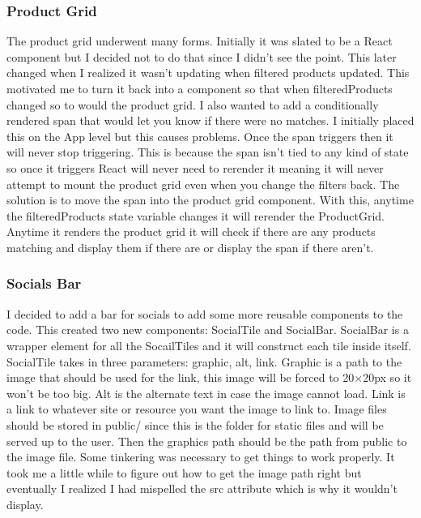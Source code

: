 \documentclass{article}[12pt]
\begin{document}
\subsubsection{Product Grid}
The product grid underwent many forms. Initially it was slated to be a React component but I decided not to do that since I didn't see the point. This later changed when I realized it wasn't updating when filtered products updated. This motivated me to turn it back into a component so that when filteredProducts changed so to would the product grid. I also wanted to add a conditionally rendered span that would let you know if there were no matches. I initially placed this on the App level but this causes problems. Once the span triggers then it will never stop triggering. This is because the span isn't tied to any kind of state so once it triggers React will never need to rerender it meaning it will never attempt to mount the product grid even when you change the filters back. The solution is to move the span into the product grid component. With this, anytime the filteredProducts state variable changes it will rerender the ProductGrid. Anytime it renders the product grid it will check if there are any products matching and display them if there are or display the span if there aren't.

\subsubsection{Socials Bar}
I decided to add a bar for socials to add some more reusable components to the code. This created two new components: SocialTile and SocialBar. SocialBar is a wrapper element for all the SocailTiles and it will construct each tile inside itself. SocialTile takes in three parameters: graphic, alt, link. Graphic is a path to the image that should be used for the link, this image will be forced to 20$\times$20px so it won't be too big. Alt is the alternate text in case the image cannot load. Link is a link to whatever site or resource you want the image to link to. Image files should be stored in public/ since this is the folder for static files and will be served up to the user. Then the graphics path should be the path from public to the image file. Some tinkering was necessary to get things to work properly. It took me a little while to figure out how to get the image path right but eventually I realized I had mispelled the src attribute which is why it wouldn't display.
\end{document}
